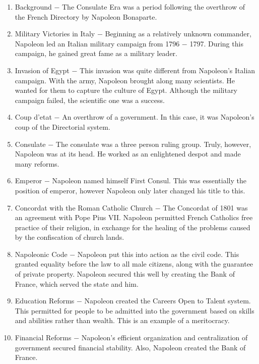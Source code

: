 \documentclass[12pt]{article}
\begin{document}
\begin{enumerate}
\item Background $-$ The Consulate Era was a period following the overthrow of the French Directory by Napoleon Bonaparte.

\item Military Victories in Italy $-$ Beginning as a relatively unknown commander, Napoleon led an Italian military campaign from 1796 $-$ 1797. During this campaign, he gained great fame as a military leader. 

\item Invasion of Egypt $-$ This invasion was quite different from Napoleon's Italian campaign. With the army, Napoleon brought along many scientists. He wanted for them to capture the culture of Egypt. Although the military campaign failed, the scientific one was a success.

\item Coup d'etat $-$ An overthrow of a government. In this case, it was Napoleon's coup of the Directorial system.

\item Consulate $-$ The consulate was a three person ruling group. Truly, however, Napoleon was at its head. He worked as an enlightened despot and made many reforms.

\item Emperor $-$ Napoleon named himself First Consul. This was essentially the position of emperor, however Napoleon only later changed his title to this.

\item Concordat with the Roman Catholic Church $-$ The Concordat of 1801 was an agreement with Pope Pius VII. Napoleon permitted French Catholics free practice of their religion, in exchange for the healing of the problems caused by the confiscation of church lands.

\item Napoleonic Code $-$ Napoleon put this into action as the civil code. This granted equality before the law to all male citizens, along with the guarantee of private property. Napoleon secured this well by creating the Bank of France, which served the state and him.

\item Education Reforms $-$ Napoleon created the Careers Open to Talent system. This permitted for people to be admitted into the government based on skills and abilities rather than wealth. This is an example of a meritocracy.

\item Financial Reforms $-$ Napoleon's efficient organization and centralization of government secured financial stability. Also, Napoleon created the Bank of France.


\end{enumerate}
\end{document}

